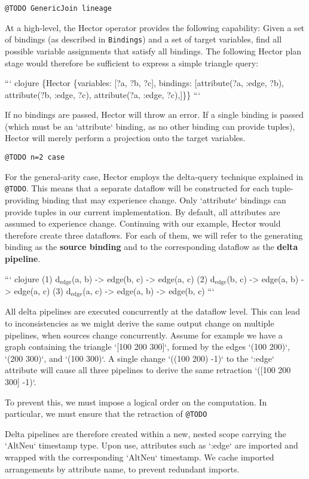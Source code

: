 \documentclass[../index.tex]{subfiles}
\begin{document}
\texttt{@TODO GenericJoin lineage}

At a high-level, the Hector operator provides the following
capability: Given a set of bindings (as described in \texttt{Bindings}) and
a set of target variables, find all possible variable assignments that
satisfy all bindings. The following Hector plan stage would therefore
be sufficient to express a simple triangle query:

``` clojure
\{Hector
 \{variables: [?a, ?b, ?c],
  bindings:  [attribute(?a, :edge, ?b),
              attribute(?b, :edge, ?c),
              attribute(?a, :edge, ?c),]\}\}
```

If no bindings are passed, Hector will throw an error. If a single
binding is passed (which must be an `attribute` binding, as no other
binding can provide tuples), Hector will merely perform a projection
onto the target variables.

\texttt{@TODO n=2 case}

For the general-arity case, Hector employs the delta-query technique
explained in \texttt{@TODO}. This means that a separate dataflow will be
constructed for each tuple-providing binding that may experience
change. Only `attribute` bindings can provide tuples in our current
implementation. By default, all attributes are assumed to experience
change. Continuing with our example, Hector would therefore create
three dataflows. For each of them, we will refer to the generating
binding as the \textbf{source binding} and to the corresponding dataflow as
the \textbf{delta pipeline}.

``` clojure
(1) d$_{\text{edge}}$(a, b) -> edge(b, c) -> edge(a, c)
(2) d$_{\text{edge}}$(b, c) -> edge(a, b) -> edge(a, c)
(3) d$_{\text{edge}}$(a, c) -> edge(a, b) -> edge(b, c)
```

All delta pipelines are executed concurrently at the dataflow
level. This can lead to inconsistencies as we might derive the same
output change on multiple pipelines, when sources change
concurrently. Assume for example we have a graph containing the
triangle `[100 200 300]`, formed by the edges `(100 200)`, `(200
300)`, and `(100 300)`. A single change `((100 200) -1)` to the
`:edge` attribute will cause all three pipelines to derive the same
retraction `([100 200 300] -1)`.

To prevent this, we must impose a logical order on the computation. In
particular, we must ensure that the retraction of \texttt{@TODO}

Delta pipelines are therefore created within a new, nested scope
carrying the `AltNeu` timestamp type. Upon use, attributes such as
`:edge` are imported and wrapped with the corresponding `AltNeu`
timestamp. We cache imported arrangements by attribute name, to
prevent redundant imports.
\end{document}
